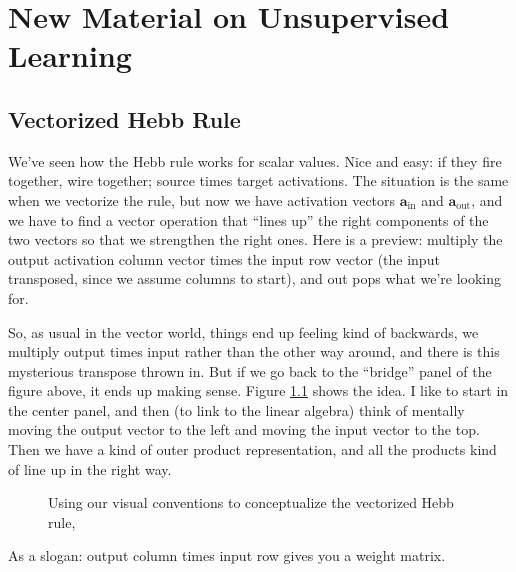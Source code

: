 \chapter{New Material on Unsupervised Learning}

\section{Vectorized Hebb Rule}

We've seen how the Hebb rule works for scalar values. Nice and easy: if they fire together, wire together; source times target activations. The situation is the same when we vectorize the rule, but now we have activation vectors $\mathbf{a}_{\text{in}}$ and $\mathbf{a}_{\text{out}}$, and we have to find a vector operation that ``lines up'' the right components of the two vectors so that we strengthen the right ones.  Here is a preview: multiply the output activation column vector times the input row vector (the input transposed, since we assume columns to start), and out pops what we're looking for.

So, as usual in the vector world, things end up feeling kind of backwards, we multiply output times input rather than the other way around, and there is this mysterious transpose thrown in.  But if we go back to the ``bridge'' panel of the figure above, it ends up making sense. Figure \ref{vectorizedHebb} shows the idea. I like to start in the center panel, and then (to link to the linear algebra) think of mentally moving the output vector to the left and moving the input vector to the top. Then we have a kind of outer product representation, and all the products kind of line up in the right way.

\begin{figure}[h]
\centering
{}
\caption[Jeff Yoshimi.]{Using our visual conventions to conceptualize the vectorized Hebb rule,}
\label{vectorizedHebb}
\end{figure}

As a slogan: output column times input row gives you a weight matrix.

